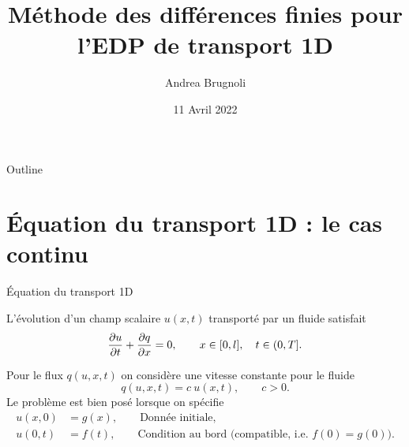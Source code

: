 \documentclass[aspectratio=169, french]{ISAE-Beamer}
\title[DF Transport 1D]{Méthode des différences finies pour l'EDP de transport 1D}
\author[Andrea Brugnoli]{Andrea Brugnoli}
\date[11/4/22]{11 Avril 2022}
\begin{document}
	
	
	\maketitle
	
	
	\begin{frame}{Outline}
		
		\tableofcontents
		
	\end{frame}

\section{Équation du transport 1D : le cas continu}

\begin{frame}{Équation du transport 1D}
	\begin{tcolorbox}[title = L'EDP la plus simple, coltitle=white]
		L'évolution d'un champ scalaire $u(x, t)$ transporté par un fluide satisfait 
		\begin{equation*}
			\diffp{u}{t} + \diffp{q}{x} = 0, \qquad x \in [0, l], \quad t \in  (0, T]. 
		\end{equation*}
	\end{tcolorbox}

\begin{tcolorbox}
	Pour le flux $q(u, x, t)$ on considère une vitesse constante pour le fluide
	\begin{equation*}
		q(u, x, t) = c \ u(x, t), \qquad c>0.
	\end{equation*}
	Le problème est bien posé lorsque on spécifie 
	\begin{align*}
		u(x, 0) &= g(x), \qquad \text{Donnée initiale}, \\
		u(0, t) &= f(t), \qquad \text{Condition au bord (compatible, i.e. $f(0) = g(0)$).}
	\end{align*}
\end{tcolorbox}

\end{frame}
\end{document}
